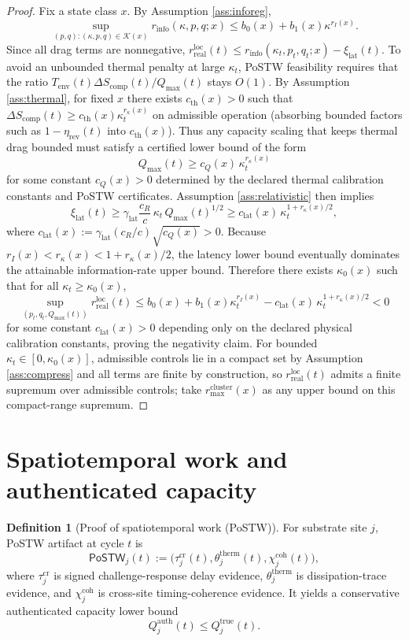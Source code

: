\documentclass[11pt,a4paper]{article}
\newcommand{\cK}{\mathcal{K}}
\theoremstyle{definition}
\newtheorem{definition}{Definition}
\theoremstyle{remark}
\begin{document}
\begin{proof}


Fix a state class $x$.
By Assumption \ref{ass:inforeg},
\[
\sup_{(p,q): (\kappa,p,q)\in \cK(x)} r_{\mathrm{info}}(\kappa,p,q;x)\le b_0(x)+b_1(x)\kappa^{r_I(x)}.
\]
Since all drag terms are nonnegative, $r_{\mathrm{real}}^{\mathrm{loc}}(t)\le r_{\mathrm{info}}(\kappa_t,p_t,q_t;x)-\xi_{\mathrm{lat}}(t)$.
To avoid an unbounded thermal penalty at large $\kappa_t$, PoSTW feasibility requires that the ratio $T_{\mathrm{env}}(t)\Delta S_{\mathrm{comp}}(t)/Q_{\max}(t)$ stays $O(1)$.
By Assumption \ref{ass:thermal}, for fixed $x$ there exists $c_{\mathrm{th}}(x)>0$ such that $\Delta S_{\mathrm{comp}}(t)\ge c_{\mathrm{th}}(x)\kappa_t^{r_{\kappa}(x)}$ on admissible operation (absorbing bounded factors such as $1-\eta_{\mathrm{rev}}(t)$ into $c_{\mathrm{th}}(x)$).
Thus any capacity scaling that keeps thermal drag bounded must satisfy a certified lower bound of the form
\[
Q_{\max}(t)\ge c_Q(x)\,\kappa_t^{r_{\kappa}(x)}
\]
for some constant $c_Q(x)>0$ determined by the declared thermal calibration constants and PoSTW certificates.
Assumption \ref{ass:relativistic} then implies
\[
\xi_{\mathrm{lat}}(t)\ge \gamma_{\mathrm{lat}}\frac{c_R}{c}\,\kappa_t\,Q_{\max}(t)^{1/2}
\ge
c_{\mathrm{lat}}(x)\,\kappa_t^{1+r_{\kappa}(x)/2},
\]
where $c_{\mathrm{lat}}(x):=\gamma_{\mathrm{lat}}(c_R/c)\sqrt{c_Q(x)}>0$.
Because $r_I(x)<r_{\kappa}(x)<1+r_{\kappa}(x)/2$, the latency lower bound eventually dominates the attainable information-rate upper bound.
Therefore there exists $\kappa_0(x)$ such that for all $\kappa_t\ge \kappa_0(x)$,
\[
\sup_{(p_t,q_t,Q_{\max}(t))} r_{\mathrm{real}}^{\mathrm{loc}}(t)\le b_0(x)+b_1(x)\kappa_t^{r_I(x)}-c_{\mathrm{lat}}(x)\,\kappa_t^{1+r_{\kappa}(x)/2}<0
\]
for some constant $c_{\mathrm{lat}}(x)>0$ depending only on the declared physical calibration constants, proving the negativity claim.
For bounded $\kappa_t\in[0,\kappa_0(x)]$, admissible controls lie in a compact set by Assumption \ref{ass:compress} and all terms are finite by construction, so $r_{\mathrm{real}}^{\mathrm{loc}}(t)$ admits a finite supremum over admissible controls; take $r_{\max}^{\mathrm{cluster}}(x)$ as any upper bound on this compact-range supremum.
\end{proof}


\section{Spatiotemporal work and authenticated capacity}
\begin{definition}[Proof of spatiotemporal work (PoSTW)]\label{def:proof_of_spatiotemporal_work_postw}
For substrate site $j$, PoSTW artifact at cycle $t$ is
\[
\mathsf{PoSTW}_j(t):=\big(\tau_j^{\mathrm{cr}}(t),\theta_j^{\mathrm{therm}}(t),\chi_j^{\mathrm{coh}}(t)\big),
\]
where $\tau_j^{\mathrm{cr}}$ is signed challenge-response delay evidence, $\theta_j^{\mathrm{therm}}$ is dissipation-trace evidence, and $\chi_j^{\mathrm{coh}}$ is cross-site timing-coherence evidence.
It yields a conservative authenticated capacity lower bound
\[
Q_j^{\mathrm{auth}}(t)\le Q_j^{\mathrm{true}}(t).
\]
\end{definition}
\end{document}
